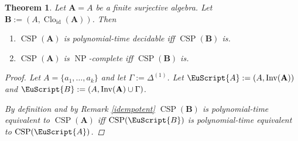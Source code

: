 \documentclass{amsart}
\theoremstyle{plain}
\newtheorem{theorem}{Theorem}[section]
\theoremstyle{definition}
\theoremstyle{remark}
\DeclareMathOperator{\Clo}{Clo}
\DeclareMathOperator{\CSP}{CSP}
\DeclareMathOperator{\Inv}{Inv}
\DeclareMathOperator{\NP}{NP}
\DeclareMathOperator{\id}{id}
\begin{document}
\begin{theorem}
    \label{thm_surj}
    Let $\mathbf{A}=A$  be a finite surjective algebra.
    Let $\mathbf{B}:=(A, \Clo_{\id}(\mathbf{A}))$. 
    Then   
    \begin{enumerate}
        \item $\CSP(\mathbf{A})$ is polynomial-time decidable iff $\CSP(\mathbf{B})$ is. 
        \item $\CSP(\mathbf{A})$ is $\NP$-complete iff $\CSP(\mathbf{B})$ is. 
    \end{enumerate}
\begin{proof}
    Let $A=\{a_1, \ldots, a_k\}$ and let $\Gamma:=\Delta^{(1)}$. 
    Let $\EuScript{A}:=(A, \Inv(\mathbf{A}))$ and $\EuScript{B}:=(A, \Inv(\mathbf{A}) \cup \Gamma )$. 

    By definition and by Remark \ref{idempotent} $\CSP(\mathbf{B})$ is polynomial-time equivalent to $\CSP(\mathbf{A})$ iff 
    $\CSP(\EuScript{B})$ is polynomial-time equivalent to $\CSP(\EuScript{A})$.


\end{proof}
\end{theorem}
\end{document}
